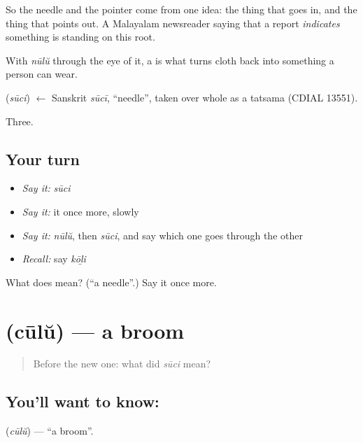 So the needle and the pointer come from one idea: the thing that goes in, and the thing that points out. A Malayalam newsreader saying that a report \emph{indicates} something is standing on this root.

With \emph{nūlŭ} through the eye of it, a  is what turns cloth back into something a person can wear.

\begin{cousinweb}
\textbf{} (\emph{sūci}) $\leftarrow$ Sanskrit \emph{sūcī}, \textquotedblleft{}needle\textquotedblright{}, taken over whole as a tatsama (CDIAL 13551).
\end{cousinweb}

\begin{grammarlens}[title={What you've built}]
Three.
\end{grammarlens}

\subsection*{Your turn}
\begin{itemize}
\raggedright
  \item \emph{Say it:} \emph{sūci}
  \item \emph{Say it:} it once more, slowly
  \item \emph{Say it:} \emph{nūlŭ}, then \emph{sūci}, and say which one goes through the other
  \item \emph{Recall:} say \emph{kōḻi}
\end{itemize}

\begin{tcolorbox}[breakable,colback=teal!4,colframe=teal!35!black,title={Before you move on}]
What does  mean? (\textquotedblleft{}a needle\textquotedblright{}.) Say it once more.
\end{tcolorbox}
\section[\texorpdfstring{\ml{ചൂല്} (cūlŭ)}{ചൂല് (cūlŭ)}]{ (cūlŭ) — a broom}

\label{lesson:ML-C62-broom}



\begin{quote}
Before the new one: what did \emph{sūci} mean?
\end{quote}

\subsection*{You'll want to know: }
\textbf{} (\emph{cūlŭ}) — \textquotedblleft{}a broom\textquotedblright{}.


